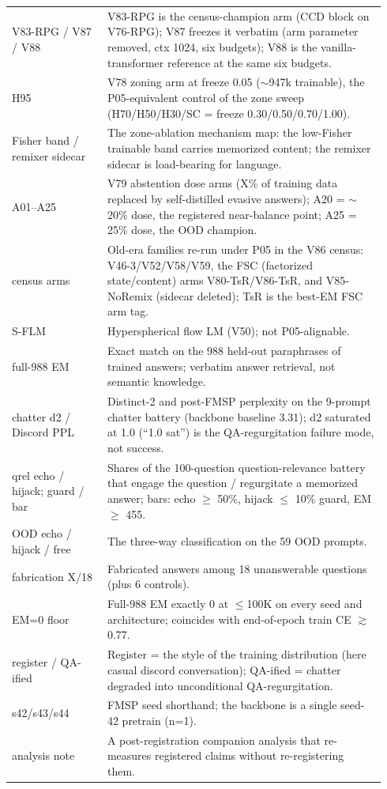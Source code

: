 \documentclass[11pt]{article}
\begin{document}
\begin{table}[!t]
\begin{tabular}{p{0.24\linewidth} p{0.70\linewidth}}
V83-RPG / V87 / V88 & V83-RPG is the census-champion arm (CCD block on V76-RPG); V87 freezes it verbatim (arm parameter removed, ctx 1024, six budgets); V88 is the vanilla-transformer reference at the same six budgets. \\
H95 & V78 zoning arm at freeze 0.05 ($\sim$947k trainable), the P05-equivalent control of the zone sweep (H70/H50/H30/SC = freeze 0.30/0.50/0.70/1.00). \\
Fisher band / remixer sidecar & The zone-ablation mechanism map: the low-Fisher trainable band carries memorized content; the remixer sidecar is load-bearing for language. \\
A01--A25 & V79 abstention dose arms (X\% of training data replaced by self-distilled evasive answers); A20 = $\sim$20\% dose, the registered near-balance point; A25 = 25\% dose, the OOD champion. \\
census arms & Old-era families re-run under P05 in the V86 census: V46-3/V52/V58/V59, the FSC (factorized state/content) arms V80-TsR/V86-TsR, and V85-NoRemix (sidecar deleted); TsR is the best-EM FSC arm tag. \\
S-FLM & Hyperspherical flow LM (V50); not P05-alignable. \\
\midrule
full-988 EM & Exact match on the 988 held-out paraphrases of trained answers; verbatim answer retrieval, not semantic knowledge. \\
chatter d2 / Discord PPL & Distinct-2 and post-FMSP perplexity on the 9-prompt chatter battery (backbone baseline 3.31); d2 saturated at 1.0 (``1.0 sat'') is the QA-regurgitation failure mode, not success. \\
qrel echo / hijack; guard / bar & Shares of the 100-question question-relevance battery that engage the question / regurgitate a memorized answer; bars: echo $\geq$ 50\%, hijack $\leq$ 10\% guard, EM $\geq$ 455. \\
OOD echo / hijack / free & The three-way classification on the 59 OOD prompts. \\
fabrication X/18 & Fabricated answers among 18 unanswerable questions (plus 6 controls). \\
EM=0 floor & Full-988 EM exactly 0 at $\leq$100K on every seed and architecture; coincides with end-of-epoch train CE $\gtrsim$ 0.77. \\
register / QA-ified & Register = the style of the training distribution (here casual discord conversation); QA-ified = chatter degraded into unconditional QA-regurgitation. \\
s42/s43/s44 & FMSP seed shorthand; the backbone is a single seed-42 pretrain (n=1). \\
analysis note & A post-registration companion analysis that re-measures registered claims without re-registering them. \\
\bottomrule
\end{tabular}
\end{table}
\end{document}

